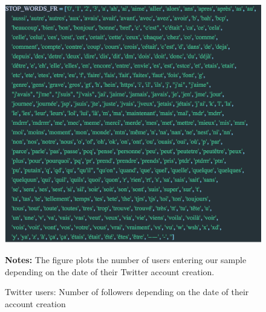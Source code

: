 \begin{figure}[h]
\begin{center}
\includegraphics[scale=.7]{figures/stop_words.png}
\end{center}
	\begin{spacing}{0.5}
		{\footnotesize \textbf{Notes:} The figure plots the number of users entering our sample depending on the date of their Twitter account creation.}
	\end{spacing}
\vspace{.5cm}	
	\caption{Twitter users: Number of followers depending on the date of their account creation}
	\label{fig:stop_words}
\end{figure}




%





